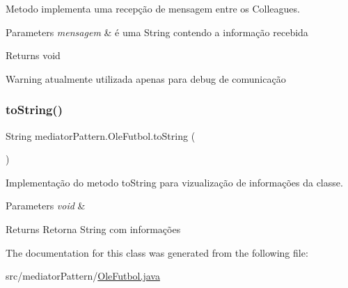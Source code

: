 Metodo implementa uma recepção de mensagem entre os Colleagues. 


\begin{DoxyParams}{Parameters}
{\em mensagem} & é uma String contendo a informação recebida \\
\hline
\end{DoxyParams}
\begin{DoxyReturn}{Returns}
void 
\end{DoxyReturn}
\begin{DoxyWarning}{Warning}
atualmente utilizada apenas para debug de comunicação 
\end{DoxyWarning}
\mbox{\label{classmediator_pattern_1_1_ole_futbol_aa9e78578bee9863c98d2728f480a98ea}} 
\subsubsection{\texorpdfstring{toString()}{toString()}}
{\footnotesize\ttfamily String mediator\+Pattern.\+Ole\+Futbol.\+to\+String (\begin{DoxyParamCaption}{ }\end{DoxyParamCaption})}



Implementação do metodo to\+String para vizualização de informações da classe. 


\begin{DoxyParams}{Parameters}
{\em void} & \\
\hline
\end{DoxyParams}
\begin{DoxyReturn}{Returns}
Retorna String com informações 
\end{DoxyReturn}


The documentation for this class was generated from the following file\+:\begin{DoxyCompactItemize}
\item 
src/mediator\+Pattern/\mbox{\hyperlink{_ole_futbol_8java}{Ole\+Futbol.\+java}}\end{DoxyCompactItemize}
